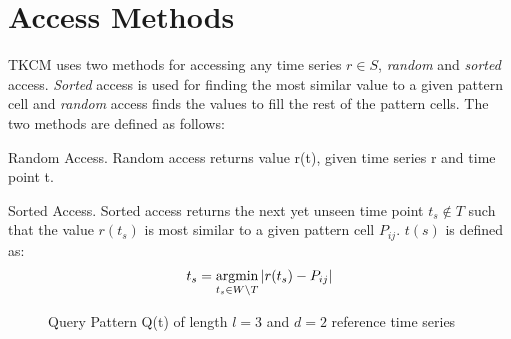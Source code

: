\documentclass[abstracton,12pt]{scrreprt}
\begin{document}
\section{Access Methods}
\label{AccessMethods}
TKCM uses two methods for accessing any time series $r \in S$, \emph{random} and \emph{sorted} access. \emph{Sorted} access is used for finding the most similar value to a given pattern cell and \emph{random} access finds the values to fill the rest of the pattern cells. The two methods are defined as follows: 
\begin{defn}
 	Random Access. Random access returns value r(t), given time series r and time point t.	
\end{defn}
\begin{defn}
	Sorted Access. Sorted access returns the next yet unseen time point $t_s \notin T$ such that the value $r(t_s)$ is most similar to a given pattern cell $P_{ij}$. $t(s)$ is defined as:
	\begin{align*}
	t_s = \argmin_{t_s \in W \setminus T} |r(t_s) - P_{ij}|
	\end{align*}
\end{defn}
\begin{figure}[H]
	\centering
\caption{Query Pattern Q(t) of length $l=3$ and $d=2$ reference time series}
\end{figure}
\end{document}
